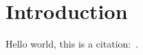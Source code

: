 \chapter{Introduction}
\label{chap:introduction}

Hello world, this is a citation:~\cite{Guyton:1956:TextbookPhysiology}.


\printbibliography[heading=subbibliography]

